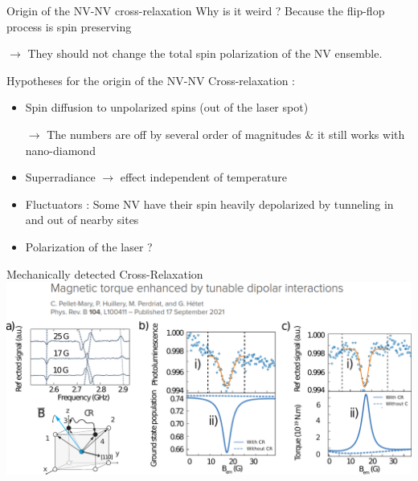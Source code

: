 \documentclass{beamer}
\begin{document}
\begin{frame}{Origin of the NV-NV cross-relaxation}
Why is it weird ? Because the flip-flop process is spin preserving

$\to$ They should not change the total spin polarization of the NV ensemble.
\bigskip

Hypotheses for the origin of the NV-NV Cross-relaxation :
\begin{itemize}
\item Spin diffusion to unpolarized spins (out of the laser spot)

$\to$ The numbers are off by several order of magnitudes \& it still works with nano-diamond

\item Superradiance $\to$ effect independent of temperature
\item Fluctuators : Some NV have their spin heavily depolarized by tunneling in and out of nearby sites
\item Polarization of the laser ?
\end{itemize}
\end{frame}
\begin{frame}{Mechanically detected Cross-Relaxation}
\centering
\includegraphics[scale=.45]{slide_cr_meca}
\end{frame}
\end{document}
